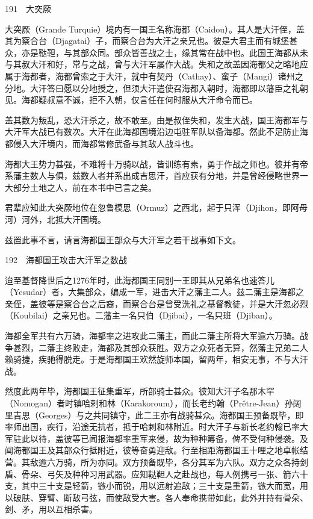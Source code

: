 \documentclass[12pt,UTF8]{ctexbook}
\begin{document}
191　大突厥

大突厥（Grande Turquie）境内有一国王名称海都（Caidou）。其人是大汗侄，盖其为察合台（Djagatai）子，而察合台为大汗之亲兄也。彼是大君主而有城堡甚众，亦是鞑靼，与其部众同。部众皆善战之士，缘其常在战中也。此国王海都从未与其叔大汗和好，常与之战，曾与大汗军屡作大战。失和之故盖因海都父之略地应属于海都者，海都曾索之于大汗，就中有契丹（Cathay）、蛮子（Mangi）诸州之分地。大汗答曰愿以分地授之，但须大汗遣使召海都入朝时，海都即以藩臣之礼朝见。海都疑叔意不诚，拒不入朝，仅言任在何时服从大汗命令而已。

盖其数为叛乱，恐大汗杀之，故不敢至。由是叔侄失和，发生大战，国王海都军与大汗军大战已有数次。大汗在此海都国境沿边屯驻军队以备海都。然此不足防止海都侵入大汗境内，而海都常修武备与其敌人战斗也。

海都大王势力甚强，不难将十万骑以战，皆训练有素，勇于作战之师也。彼并有帝系藩主数人与俱，兹数人者并系出成吉思汗，首应获有分地，并是曾经侵略世界一大部分土地之人，前在本书中已言之矣。

君辈应知此大突厥地位在忽鲁模思（Ormuz）之西北，起于只浑（Djihon，即阿母河）河外，北抵大汗国境。

兹置此事不言，请言海都国王部众与大汗军之若干战事如下文。





192　海都国王攻击大汗军之数战

迨至基督降世后之1276年时，此海都国王同别一王即其从兄弟名也速答儿（Yesudar）者，大集部众，编成一军，进击大汗之藩主二人。兹二藩主是海都之亲侄，盖彼等是察合台之后裔，而察合台是曾受洗礼之基督教徒，并是大汗忽必烈（Koubilai）之亲兄也。二藩主一名只伯（Djibai），一名只班（Djiban）。

海都全军共有六万骑，海都率之进攻此二藩主，而此二藩主所将大军逾六万骑。战争甚烈，二藩主终败走，海都及其部众获胜。双方之众死者无算，然藩主兄弟二人赖骑捷，疾驰得脱走。于是海都国王欢然旋师本国，留两年，相安无事，不与大汗战。

然度此两年毕，海都国王征集重军，所部骑士甚众。彼知大汗子名那木罕（Nomogan）者时镇哈剌和林（Karakoroum），而长老约翰（Prêtre-Jean）孙阔里吉思（Georges）与之共同镇守，此二王亦有战骑甚众。海都国王预备既毕，即率师出国，疾行，沿途无抗者，抵于哈剌和林附近。时大汗子与新长老约翰已率大军驻此以待，盖彼等已闻报海都率重军来侵，故为种种筹备，俾不受何种侵袭。及闻海都国王及其部众行抵附近，彼等奋勇迎敌。行至相距海都国王十哩之地卓帐结营。其敌逾六万骑，所为亦同。双方预备既毕，各分其军为六队。双方之众各持剑盾、骨朵、弓矢及种种习用武器。应知鞑靼人之赴战也，每人例携弓一张、箭六十支，其中三十支是轻箭，镞小而锐，用以远射追敌；三十支是重箭，镞大而宽，用以破肤、穿臂、断敌弓弦，而使敌受大害。各人奉命携带如此，此外并持有骨朵、剑、矛，用以互相杀害。
\end{document}
